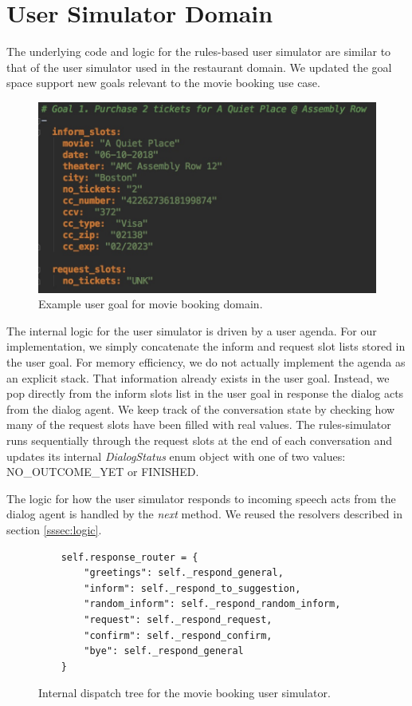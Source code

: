 \section{User Simulator Domain}

The underlying code and logic for the rules-based user simulator are similar to that of the user simulator used in the restaurant domain. We updated the goal space support new goals relevant to the movie booking use case.

\begin{figure}[h!]
	\centering
	\includegraphics[scale=.25]{diagrams/sample_movie_goal.jpeg}
	\caption{ Example user goal for movie booking domain.}
	\label{fig:movie_goal}
\end{figure}

The internal logic for the user simulator is driven by a user agenda. For our implementation, we simply concatenate the inform and request slot lists stored in the user goal. For memory efficiency, we do not actually implement the agenda as an explicit stack. That information already exists in the user goal. Instead, we pop directly from the inform slots list in the user goal in response the dialog acts from the dialog agent. We keep track of the conversation state by checking how many of the request slots have been filled with real values. The rules-simulator runs sequentially through the request slots at the end of each conversation and updates its internal \textit{DialogStatus} enum object with one of two values: NO\_OUTCOME\_YET or FINISHED.

The logic for how the user simulator responds to incoming speech acts from the dialog agent is handled by the \textit{next} method. We reused the resolvers described in section \ref{sssec:logic}.

\begin{figure}[h!]
	\label{fig:movie_dispatch_tree}
	\begin{lstlisting}
 	self.response_router = {
 		"greetings": self._respond_general,
		"inform": self._respond_to_suggestion,
		"random_inform": self._respond_random_inform,
		"request": self._respond_request,
		"confirm": self._respond_confirm,
		"bye": self._respond_general
	}
	\end{lstlisting}
	\caption{ Internal dispatch tree for the movie booking user simulator.}
\end{figure}

